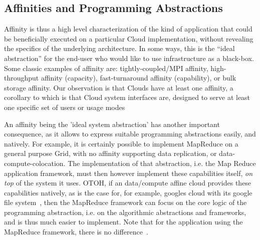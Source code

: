 \documentclass{article}
\newcommand{\I}[1]{\textit{#1}}
\begin{document}
 \subsection{Affinities and Programming Abstractions}

  Affinity is thus a high level characterization of the kind of
  application that could be beneficially executed on a particular
  Cloud implementation, without revealing the specifics of the
  underlying architecture. In some ways, this is the ``ideal
  abstraction'' for the end-user who would like to use infrastructure
  as a black-box.  Some classic examples of affinity are:
  tightly-coupled/MPI affinity, high-throughput affinity (capacity),
  fast-turnaround affinity (capability), or bulk storage affinity.
  Our observation is that Clouds have at least one affinity, a
  corollary to which is that Cloud system interfaces are, designed to
  serve at least one specific set of users or usage modes


  An affinity being the 'ideal system abstraction' has another
  important consequence, as it allows to express suitable programming
  abstractions easily, and natively.  For example, it is certainly
  possible to implement MapReduce on a general purpose Grid, with no
  affinity supporting data replication, or data-compute-colocation.
  The implementation of that abstraction, i.e. the Map Reduce
  application framework, must then however implement these
  capabilities itself, \I{on top} of the system it uses.  OTOH, if an
  data/compute affine cloud provides these capabilities natively, as
  is the case for, for example, googles cloud with its google file
  system~\cite{gfs}, then the MapReduce framework can focus on the
  core logic of the programming abstraction, i.e. on the algorithmic
  abstractions and frameworks, and is thus much easier to implement.
  Note that for the application using the MapReduce framework, there
  is no difference~\cite{gsoc-saga}.
\end{document}
